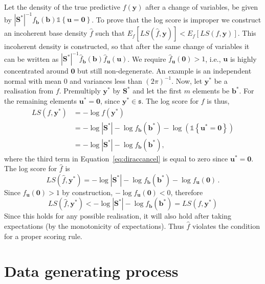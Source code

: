 \documentclass[12pt]{article}
\theoremstyle{definition}
\begin{document}
Let the density of the true predictive $f(\bm{y})$ after a change of variables, be given by $|\bm{S^*}|^{-1}f_{\bm b}(\bm{b})\mathbb{1}\left\{\bm{u}=\bm{0}\right\}$.  To prove that the log score is improper we construct an incoherent base density $\hat{f}$ such that $E_f\left[LS\left(\hat{f},\bm{y}\right)\right]<E_f\left[LS\left(f,\bm{y}\right)\right]$. This incoherent density is constructed, so that after the same change of variables it can be written as $|\bm{S^*}|^{-1}\hat{f}_{\bm b}(\bm{b})\hat{f}_{\bm{u}}(\bm{u})$. We require $\hat{f}_{\bm u}(\bm{0})>1$, i.e., ${\bm u}$ is highly concentrated around $\bm{0}$ but still non-degenerate. An example is an independent normal with mean 0 and variances less than $(2\pi)^{-1}$. Now, let $\bm{y}^*$ be a realisation from $f$. Premultiply $\bm{y}^*$ by $\bm{S}^*$ and let the first $m$ elements be $\bm{b^*}$.  For the remaining elements ${\bm u}^*={\bm 0}$, since $\bm{y}^*\in\mathfrak{s}$.  The log score for $f$ is thus,	
\begin{align}
LS\left(f,\bm{y}^*\right) &= -\log f(\bm{y}^*) \nonumber\\
&=-\log|\bm{S^*}|-\log f_{\bm{b}}\left(\bm{b}^*\right)-\log\left(\mathbb{1}\left\{\bm{u}^*=\bm{0}\right\}\right)\label{eq:diraccancel}\\
&=-\log|\bm{S^*}|-\log f_{\bm{b}}\left(\bm{b}^*\right),\nonumber
\end{align}
where the third term in Equation~\ref{eq:diraccancel} is equal to zero since $\bm{u}^*=\bm{0}$.  The log score for $\hat{f}$ is
\[
LS\left(\hat{f},\bm{y}^*\right) = -\log|\bm{S^*}|-\log f_{\bm{b}}(\bm{b}^*)- \log f_{\bm u}(\bm{0})\,.
\]
Since $f_{\bm u}(\bm{0})>1$ by construction, $-\log f_{\bm u}(\bm{0})<0$, therefore
\[
LS\left(\hat{f},\bm{y}^*\right) <-\log|\bm{S^*}|-\log f_{\bm b}(\bm{b}^*)=LS\left(f,\bm{y}^*\right)
\]
Since this holds for any possible realisation, it will also hold after taking expectations (by the monotonicity of expectations).  Thus $\hat{f}$ violates the condition for a proper scoring rule.

\clearpage
\section{Data generating process} \label{app:DGP}
\end{document}
